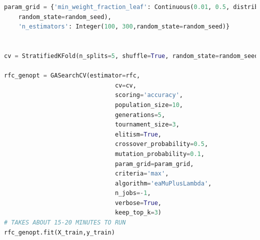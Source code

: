 \begin{lstlisting}[language=Python, caption = {Applying Genetic algorithm on Random Forest Classifier}, label={lst:GARFC}]
param_grid = {'min_weight_fraction_leaf': Continuous(0.01, 0.5, distribution='log-uniform',
    random_state=random_seed),
    'n_estimators': Integer(100, 300,random_state=random_seed)}


cv = StratifiedKFold(n_splits=5, shuffle=True, random_state=random_seed)

rfc_genopt = GASearchCV(estimator=rfc,
                               cv=cv,
                               scoring='accuracy',
                               population_size=10,
                               generations=5,
                               tournament_size=3,
                               elitism=True,
                               crossover_probability=0.5,
                               mutation_probability=0.1,
                               param_grid=param_grid,
                               criteria='max',
                               algorithm='eaMuPlusLambda',
                               n_jobs=-1,
                               verbose=True,
                               keep_top_k=3)
# TAKES ABOUT 15-20 MINUTES TO RUN
rfc_genopt.fit(X_train,y_train)
\end{lstlisting}

